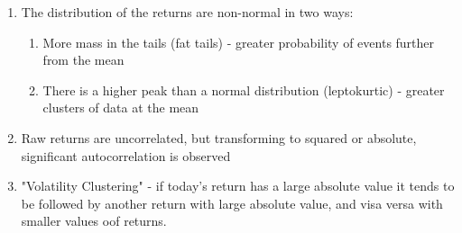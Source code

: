 \begin{enumerate}
    \item The distribution of the returns are non-normal in two ways:
    \begin{enumerate}
        \item More mass in the tails (fat tails) - greater probability of events further from the mean
        \item There is a higher peak than a normal distribution (leptokurtic) - greater clusters of data at the mean
    \end{enumerate}
    \item Raw returns are uncorrelated, but transforming to squared or absolute, significant autocorrelation is observed
    \item "Volatility Clustering" - if today's return has a large absolute value it tends to be followed by another return with large absolute value, and visa versa with smaller values oof returns.  
\end{enumerate}

\cite{Popov2022}


